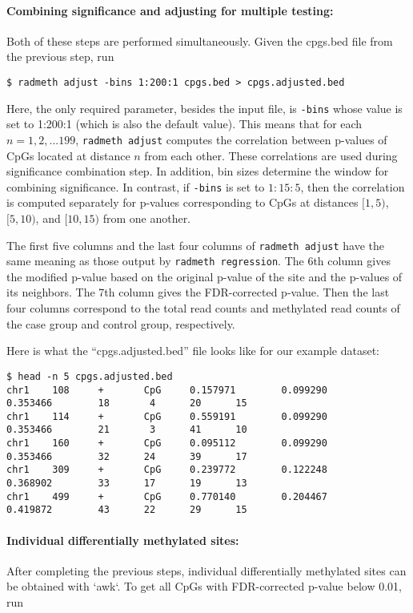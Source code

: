 \documentclass[10pt]{article}
\begin{document}
\paragraph{Combining significance and adjusting for multiple testing:} Both
of these steps are performed simultaneously. Given the cpgs.bed file from
the previous step, run
\begin{verbatim}
$ radmeth adjust -bins 1:200:1 cpgs.bed > cpgs.adjusted.bed
\end{verbatim}%
Here, the only required parameter, besides the input file, is {\tt -bins}
whose value is set to 1:200:1 (which is also the default value). This means
that for  each $n = 1, 2, . . . 199$, {\tt radmeth adjust} computes the
correlation between p-values of CpGs located at distance $n$ from each other.
These correlations are used during significance combination step. In
addition, bin sizes determine the window for combining significance. In
contrast, if {\tt -bins} is set to $1:15:5$, then the correlation is computed
separately for p-values corresponding to CpGs at distances $[1, 5)$, $[5,
10)$, and $[10, 15)$ from one another.

The first five columns and the last four columns of {\tt radmeth adjust} have
the same meaning as those output by {\tt radmeth regression}. The 6th column
gives the modified p-value based on the original p-value of the site and the
p-values of its neighbors. The 7th column gives the FDR-corrected p-value.
Then the last four columns correspond to the total read counts and
methylated read counts of the case group and control group, respectively.

Here is what the ``cpgs.adjusted.bed'' file looks like for our example dataset:

{\small{%
\begin{verbatim}
$ head -n 5 cpgs.adjusted.bed
chr1    108     +       CpG     0.157971        0.099290        0.353466        18       4      20      15
chr1    114     +       CpG     0.559191        0.099290        0.353466        21       3      41      10
chr1    160     +       CpG     0.095112        0.099290        0.353466        32      24      39      17
chr1    309     +       CpG     0.239772        0.122248        0.368902        33      17      19      13
chr1    499     +       CpG     0.770140        0.204467        0.419872        43      22      29      15
\end{verbatim}%
}}

\paragraph{Individual differentially methylated sites:} After completing the
previous steps, individual differentially methylated sites can be obtained with
`awk`. To get all CpGs with FDR-corrected p-value below 0.01, run
\end{document}
